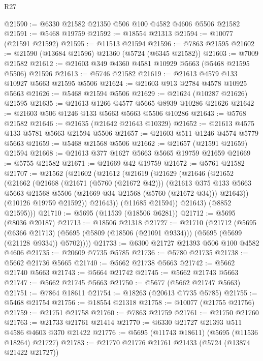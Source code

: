 \begin{lexlean}{R27}
\begin{coremodule}
@21590 := @6330 @21582 @21350 @506 @100 @4582 @4606 @5506 @21582
@21591 := @5468 @19759
@21592 := @18554 @21313
@21594 := @10077 (@21591 @21592)
@21595 := @11513 @21594
@21596 := @7863 @21595
@21602 := @21590 (@13684 @21596) @21360 (@5724 (@6345 @21582))
@21603 := @7009 @21582
@21612 := @21603 @349 @4360 @4581 @10929 @5663 (@5468 @21595 @5506) @21596
@21613 := @5746 @21582
@21619 := @21613 @4579 @133 @10927 @5663 @21595 @5506
@21624 := @21603 @913 @2784 @4578 @10925 @5663
@21626 := @5468 @21594 @5506
@21629 := @21624 (@10287 @21626) @21595
@21635 := @21613 @1266 @4577 @5665 @8939 @10286 @21626
@21642 := @21603 @506 @1246 @133 @5663 @5663 @5506 @10286
@21643 := @5768 @21582
@21646 := @21635 (@21642 @21643 @10329)
@21652 := @21613 @4575 @133 @5781 @5663 @21594 @5506
@21657 := @21603 @511 @1246 @4574 @5779 @5663
@21659 := @5468 @21568 @5506
@21662 := @21657 (@21591 @21659) @21594
@21668 := @21613 @377 @1627 @5663 @5665 @19759 @21659
@21669 := @5755 @21582
@21671 := @21669 @42 @19759
@21672 := @5761 @21582
@21707 := @21562
    (@21602
      (@21612
        (@21619
          (@21629
            (@21646
              (@21652
                (@21662
                  (@21668
                    (@21671 (@5760 (@21672 @42)))
                    (@21613
                      @375
                      @133
                      @5663
                      @5663
                      @21568
                      @5506
                      (@21669 @34 @21568 (@5760 (@21672 @34)))
                      @21643))
                  (@10126 @19759 @21592))
                @21643))
            (@11685 @21594))
          @21643)
        (@8852 @21595)))
@21710 := @5695 (@11539 (@18506 @6281))
@21712 := @5695 (@8036 @20187)
@21713 := @18506 @21318
@21727 := @21710
    (@21712
      (@5695
        (@6366 @21713)
        (@5695 (@5809 (@18506 (@21091 @9334))) (@5695 (@5699 (@21128 @9334)) @5702))))
@21733 := @6300 @21727 @21393 @506 @100 @4582 @4606
@21735 := @20609 @7735 @5785
@21736 := @5780 @21735
@21738 := @5662 @21736 @5665
@21740 := @5662 @21738 @5663
@21742 := @5662 @21740 @5663
@21743 := @5664 @21742
@21745 := @5662 @21743 @5663
@21747 := @5662 @21745 @5663
@21750 := @5677 (@5662 @21747 @5663)
@21751 := @7864 @18611
@21754 := @18263 (@20613 @7735 @5785)
@21755 := @5468 @21754
@21756 := @18554 @21318
@21758 := @10077 (@21755 @21756)
@21759 := @21751 @21758
@21760 := @7863 @21759
@21761 := @21750 @21760
@21763 := @21733 @21761 @21414
@21770 := @6330 @21727 @21393 @511 @4586 @4603 @370 @21422
@21776 := @5695 (@11743 @18611) (@5695 (@11536 @18264) @21727)
@21783 := @21770 @21776 @21761 @21433 (@5724 (@13874 @21422 @21727))

\end{coremodule}
\end{lexlean}
